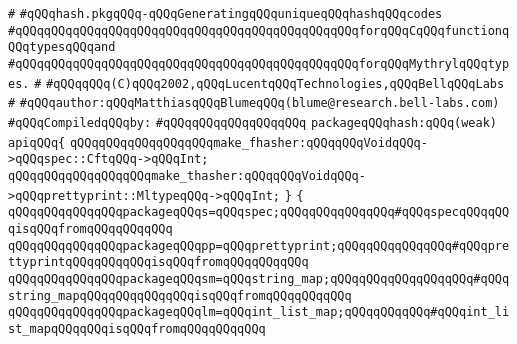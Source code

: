 \label{src/app/c-glue-maker/hash.pkg}
\verb|#|\newline
\verb|#qQQqhash.pkgqQQq-qQQqGeneratingqQQquniqueqQQqhashqQQqcodes|\newline
\verb|#qQQqqQQqqQQqqQQqqQQqqQQqqQQqqQQqqQQqqQQqqQQqqQQqforqQQqCqQQqfunctionqQQqtypesqQQqand|\newline
\verb|#qQQqqQQqqQQqqQQqqQQqqQQqqQQqqQQqqQQqqQQqqQQqqQQqforqQQqMythrylqQQqtypes.|\newline
\verb|#|\newline
\verb|#qQQqqQQq(C)qQQq2002,qQQqLucentqQQqTechnologies,qQQqBellqQQqLabs|\newline
\verb|#|\newline
\verb|#qQQqauthor:qQQqMatthiasqQQqBlumeqQQq(blume@research.bell-labs.com)|\newline
\newline
\verb|#qQQqCompiledqQQqby:|\newline
\verb|#qQQqqQQqqQQqqQQqqQQq|\newline
\newline
\newline
\newline
\verb|packageqQQqhash:qQQq(weak)|\newline
\verb|apiqQQq{|\newline
\verb|qQQqqQQqqQQqqQQqqQQqmake_fhasher:qQQqqQQqVoidqQQq->qQQqspec::CftqQQq->qQQqInt;|\newline
\verb|qQQqqQQqqQQqqQQqqQQqmake_thasher:qQQqqQQqVoidqQQq->qQQqprettyprint::MltypeqQQq->qQQqInt;|\newline
\verb|}|\newline
\verb|{|\newline
\newline
\verb|qQQqqQQqqQQqqQQqpackageqQQqs=qQQqspec;qQQqqQQqqQQqqQQq#qQQqspecqQQqqQQqisqQQqfromqQQqqQQqqQQq|\newline
\verb|qQQqqQQqqQQqqQQqpackageqQQqpp=qQQqprettyprint;qQQqqQQqqQQqqQQq#qQQqprettyprintqQQqqQQqqQQqisqQQqfromqQQqqQQqqQQq|\newline
\verb|qQQqqQQqqQQqqQQqpackageqQQqsm=qQQqstring_map;qQQqqQQqqQQqqQQqqQQq#qQQqstring_mapqQQqqQQqqQQqqQQqisqQQqfromqQQqqQQqqQQq|\newline
\verb|qQQqqQQqqQQqqQQqpackageqQQqlm=qQQqint_list_map;qQQqqQQqqQQq#qQQqint_list_mapqQQqqQQqisqQQqfromqQQqqQQqqQQq|\newline
